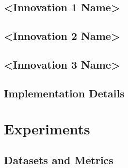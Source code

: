 \documentclass[journal,onecolumn,draftcls]{IEEEtran}
\begin{document}
\subsection{<Innovation 1 Name>}
\label{sec:method-innov1}


\subsection{<Innovation 2 Name>}
\label{sec:method-innov2}


\subsection{<Innovation 3 Name>}
\label{sec:method-innov3}



\subsection{Implementation Details}
\label{sec:method-implementation}


\section{Experiments}
\label{sec:experiments}

\subsection{Datasets and Metrics}
\label{sec:exp-datasets}
\end{document}
